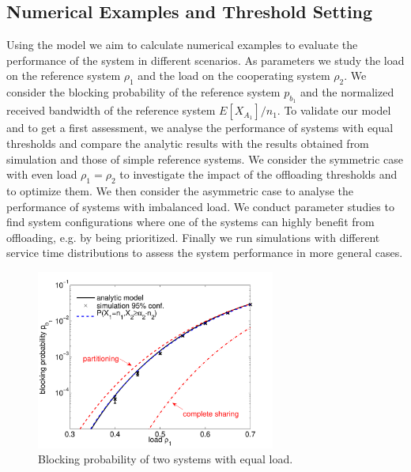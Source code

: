 \subsection{Numerical Examples and Threshold Setting}\label{sec:aggregation:performance_model:numerical_examples}

Using the model we aim to calculate numerical examples to evaluate the performance of the system in different scenarios.
As parameters we study the load on the reference system $\rho_1$ and the load on the cooperating system $\rho_2$.
We consider the blocking probability of the reference system $p_{b_1}$ and the normalized received bandwidth of the reference system $E[X_{A_1}]/n_1$.
To validate our model and to get a first assessment, we analyse the performance of systems with equal thresholds and compare the analytic results with the results obtained from simulation and those of simple reference systems.
We consider the symmetric case with even load $\rho_1=\rho_2$ to investigate the impact of the offloading thresholds and to optimize them.
We then consider the asymmetric case to analyse the performance of systems with imbalanced load.
We conduct parameter studies to find system configurations where one of the systems can highly benefit from offloading, e.g. by being prioritized.
Finally we run simulations with different service time distributions to assess the system performance in more general cases.

\begin{figure}[tb]
	\centering
	\includegraphics[width=0.7\textwidth]{aggregation/performance_model/figures/m2_n20_comp}
 	\caption{Blocking probability of two systems with equal load.}
 	\label{fig:m2_comp}
\end{figure}


